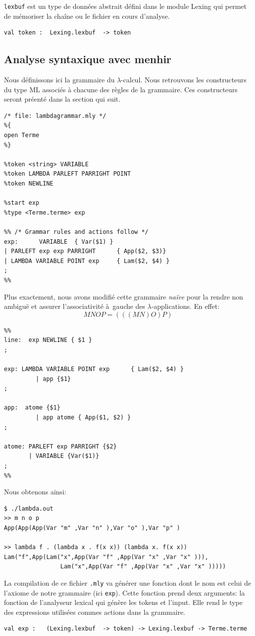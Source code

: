 \documentclass[11pt]{book}
\begin{document}
\verb+lexbuf+  est un type de données abstrait défini dans le module Lexing 
qui permet de mémoriser la chaîne ou le fichier en cours d'analyse.
\begin{Verbatim}
val token :  Lexing.lexbuf  -> token 
\end{Verbatim}

\subsection{Analyse syntaxique avec menhir}
Nous d\'{e}finissons ici la grammaire du $\lambda$-calcul.
Nous retrouvons les constructeurs du type ML associ\'{e}s \`{a} chacune des r\`{e}gles de la grammaire.
Ces constructeurs seront préenté dans la section qui suit.


\begin{Verbatim}
/* file: lambdagrammar.mly */
%{
open Terme
%}

%token <string> VARIABLE
%token LAMBDA PARLEFT PARRIGHT POINT
%token NEWLINE

%start exp
%type <Terme.terme> exp

%% /* Grammar rules and actions follow */
exp:      VARIABLE	{ Var($1) }
| PARLEFT exp exp PARRIGHT		{ App($2, $3)}
| LAMBDA VARIABLE POINT exp		{ Lam($2, $4) }
;
%%
\end{Verbatim}



Plus exactement, nous avons modifié cette grammaire \textit{naïve} pour la
rendre non ambiguë et assurer l'associativité à gauche des
$\lambda$-applications.
En effet: 
$$ M N O P = (((M N) O) P) $$
\begin{Verbatim}
%% 
line:  exp NEWLINE { $1 }
;

exp: LAMBDA VARIABLE POINT exp		{ Lam($2, $4) }
		 | app {$1}
;

app:  atome {$1}
		 | app atome { App($1, $2) }
;

atome: PARLEFT exp PARRIGHT {$2}
       | VARIABLE {Var($1)}
;		
%%
\end{Verbatim}
Nous obtenons ainsi:
\begin{Verbatim}
$ ./lambda.out
>> m n o p
App(App(App(Var "m" ,Var "n" ),Var "o" ),Var "p" )

>> lambda f . (lambda x . f(x x)) (lambda x. f(x x))
Lam("f",App(Lam("x",App(Var "f" ,App(Var "x" ,Var "x" ))),
				Lam("x",App(Var "f" ,App(Var "x" ,Var "x" )))))
\end{Verbatim}



La compilation de ce fichier \verb+.mly+ va générer une fonction dont le nom
est celui de l'axiome de notre grammaire (ici \verb+exp+). Cette fonction prend deux arguments: la fonction de l'analyseur lexical qui génère les tokens et l'input. Elle rend le type
des expressions utilisées commes actions dans la grammaire.
\begin{Verbatim}
val exp :   (Lexing.lexbuf  -> token) -> Lexing.lexbuf -> Terme.terme
\end{Verbatim}
\end{document}

